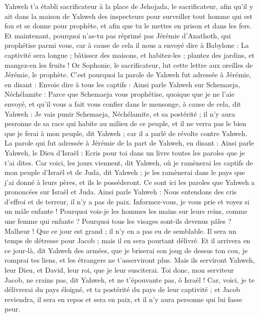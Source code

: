 \begin{multicols}{2}
Yahweh t'a établi sacrificateur à la place de Jehojada, le sacrificateur, afin qu'il y ait dans la maison de Yahweh des inspecteurs pour surveiller tout homme qui est fou et se donne pour prophète, et afin que tu le mettes en prison et dans les fers.
Et maintenant, pourquoi n'as-tu pas réprimé pas Jérémie d'Anathoth, qui prophétise parmi vous,
car à cause de cela il nous a envoyé dire à Babylone : La captivité sera longue ; bâtissez des maisons, et habitez-les ; plantez des jardins, et mangez-en les fruits !
Or Sophonie, le sacrificateur, lut cette lettre aux oreilles de Jérémie, le prophète.
C'est pourquoi la parole de Yahweh fut adressée à Jérémie, en disant :
Envoie dire à tous les captifs : Ainsi parle Yahweh sur Schemaeja, Néchélamite : Parce que Schemaeja vous prophétise, quoique que je ne l'aie envoyé, et qu'il vous a fait vous confier dans le mensonge,
à cause de cela, dit Yahweh : Je vais punir Schemaeja, Néchélamite, et sa postérité ; il n'y aura pesronne de sa race qui  habite au milieu de ce peuple, et il ne verra pas le bien que je ferai à mon peuple, dit Yahweh ; car il a parlé de révolte contre Yahweh.
\VerseOne{}La parole qui fut adressée à Jérémie de la part de Yahweh, en disant :
Ainsi parle Yahweh, le Dieu d'Israël : Ecris pour toi dans un livre toutes les paroles que je t'ai dites.
Car voici, les jours viennent, dit Yahweh, où je ramènerai les captifs de mon peuple d'Israël et de Juda, dit Yahweh ; je les ramènerai dans le pays que j'ai donné à leurs pères, et ils le posséderont.
Ce sont ici les paroles que Yahweh a prononcées sur Israël et Juda.
Ainsi parle Yahweh : Nous entendons des cris d'effroi et de terreur, il n'y a pas de paix.
Informez-vous, je vous prie et voyez si un mâle enfante ! Pourquoi vois-je les hommes les mains sur leurs reins, comme une femme qui enfante ? Pourquoi tous les visages sont-ils devenus pâles ?
Malheur ! Que ce jour est grand ; il n'y en a pas eu de semblable. Il sera un temps de détresse pour Jacob ; mais il en sera pourtant délivré.
Et il arrivera en ce jour-là, dit Yahweh des armées, que je briserai son joug de dessus ton cou, je romprai tes liens, et les étrangers ne t'asserviront plus.
Mais ils serviront Yahweh, leur Dieu, et David, leur roi, que je leur susciterai.
Toi donc, mon serviteur Jacob, ne crains pas, dit Yahweh, et ne t'épouvante pas, ô Israël ! Car, voici, je te délivrerai du pays éloigné, et ta postérité du pays de leur captivité ; et Jacob reviendra, il sera en repos et sera en paix, et il n'y aura personne qui lui fasse peur.

\end{multicols}
